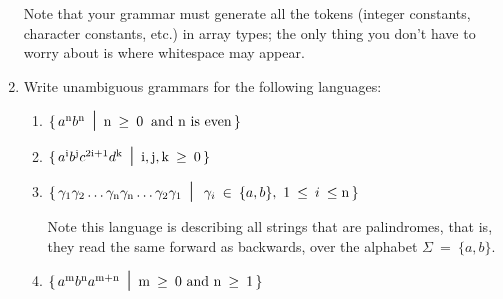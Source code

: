 \documentclass[11pt]{article}
\begin{document}
\begin{enumerate}
\begin{itemize}
          \end{itemize}

          \vspace{-1.75mm}

          Note that your grammar must generate all the tokens (integer
          constants, character constants, etc.) in array types; the only
          thing you don't have to worry about is where whitespace may
          appear.

    \item Write unambiguous grammars for the following languages:

          \vspace{-1mm}

          \begin{enumerate}

            \addtolength{\itemsep}{4mm}

            \item \(
                    \{ \,
                      {a^\mathrm{n}}{b^\mathrm{n}} \mbox{\Large \ensuremath{\ \mid \ }}
                       \mathrm{n} \: \geq \: 0 \ \:
                       \mathrm{and} \ \mathrm{n} \ \textrm{is even}
                     \, \}
                  \)

            \item \(
                    \{ \,
                      {a^\mathrm{i}}{b^\mathrm{j}}
                       {c^{2\mathrm{i}+1}}{d^\mathrm{k}} \mbox{\Large \ensuremath{\ \mid \ }}
                        \mathrm{i,j,k} \: \geq \: 0
                    \, \}
                  \)

            \item \(
                    \{ \,
                      {\gamma_1}{\gamma_2} \ldots {\gamma_\mathrm{n}}
                      {\gamma_\mathrm{n}} \ldots {\gamma_2}{\gamma_1}
                      \mbox{\Large \ensuremath{\ \mid \ }} \: \gamma_i \: \in \: \{a,b\},
                      \ 1 \: \leq \: i \: \leq \mathrm{n}
                    \, \}
                  \)

                  \medskip

                  Note this language is describing all strings that are
                  palindromes, that is, they read the same forward as
                  backwards, over the alphabet $\Sigma \: = \: \{a,b\}$.

            \item \(
                    \{ \,
                      {a^\mathrm{m}}{b^\mathrm{n}}{a^{\mathrm{m+n}}} \midspc
                       \mathrm{m} \: \geq \: 0 \ \mathrm{and} \ 
                       \mathrm{n} \: \geq \: 1
                    \, \}
                  \)


\end{enumerate}
\end{enumerate}
\end{document}
